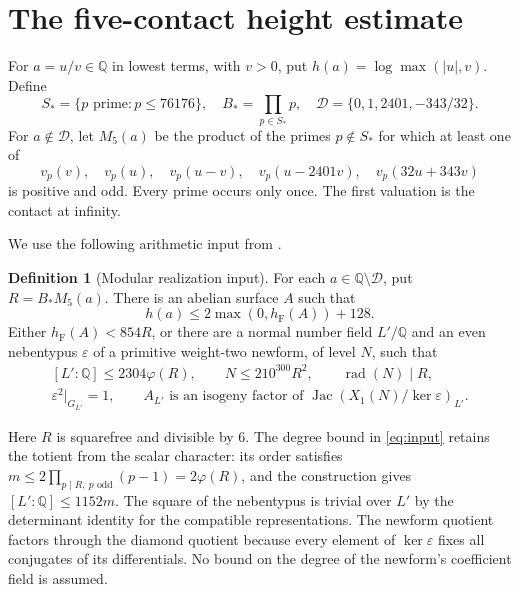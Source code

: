 \documentclass[11pt,a4paper]{article}
\theoremstyle{definition}
\newtheorem{definition}[theorem]{Definition}
\newcommand{\Q}{\mathbb Q}
\newcommand{\hF}{h_{\mathrm F}}
\newcommand{\rad}{\operatorname{rad}}
\newcommand{\Jac}{\operatorname{Jac}}
\begin{document}
\section{The five-contact height estimate}

For $a=u/v\in\Q$ in lowest terms, with $v>0$, put
$h(a)=\log\max(|u|,v)$. Define
\[
 S_*=\{p\text{ prime}:p\le76176\},\quad
 B_*=\prod_{p\in S_*}p,\quad
 \mathcal D=\{0,1,2401,-343/32\}.
\]
For $a\notin\mathcal D$, let $M_5(a)$ be the product of the
primes $p\notin S_*$ for which at least one of
\[
 v_p(v),\quad v_p(u),\quad v_p(u-v),\quad
 v_p(u-2401v),\quad v_p(32u+343v)
\]
is positive and odd. Every prime occurs only once.
The first valuation is the contact at infinity.

We use the following arithmetic input from
\cite[proof of \texttt{o8-height}, equations
\textup{(LR2)--(LR5)}, and proof of
\texttt{quartic-height19}]{Glazer}.

\begin{definition}[Modular realization input]\label{def:input}
For each $a\in\Q\setminus\mathcal D$, put $R=B_*M_5(a)$.
There is an abelian surface $A$ such that
\begin{equation}\label{eq:geometric}
 h(a)\le2\max(0,\hF(A))+128.
\end{equation}
Either $\hF(A)<854R$, or there are a normal number field $L'/\Q$
and an even nebentypus $\varepsilon$ of a primitive weight-two
newform, of level $N$, such that
\begin{equation}\label{eq:input}
 \begin{gathered}
 [L':\Q]\le2304\varphi(R),\qquad
 N\le210^{300}R^2,\qquad \rad(N)\mid R,\\
 \varepsilon^2|_{G_{L'}}=1,
 \qquad
 A_{L'}\text{ is an isogeny factor of }
       \Jac(X_1(N)/\ker\varepsilon)_{L'}.
 \end{gathered}
\end{equation}
\end{definition}

Here $R$ is squarefree and divisible by $6$.
The degree bound in \eqref{eq:input} retains the totient from the
scalar character: its order satisfies
$m\le2\prod_{p\mid R,\ p\text{ odd}}(p-1)=2\varphi(R)$,
and the construction gives $[L':\Q]\le1152m$.
The square of the nebentypus is trivial over $L'$ by the determinant
identity for the compatible representations. The newform quotient
factors through the diamond quotient because every element of
$\ker\varepsilon$ fixes all conjugates of its differentials.
No bound on the degree of the newform's coefficient field is assumed.
\end{document}
